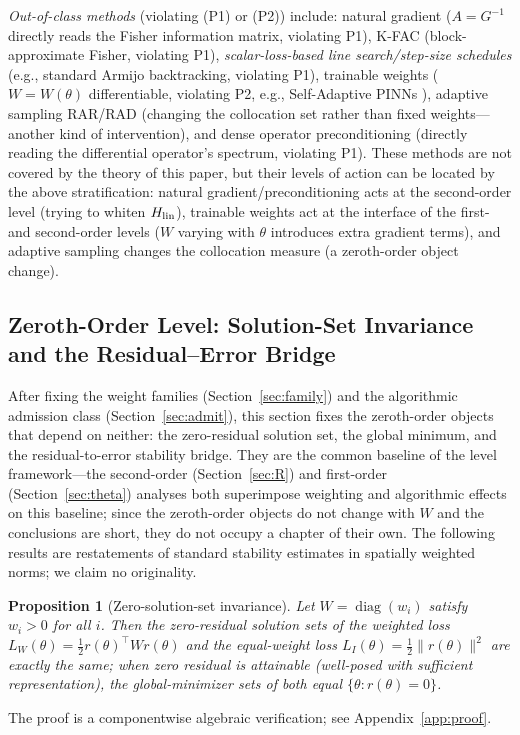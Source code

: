 \documentclass[11pt]{article}
\newcommand{\W}{W}
\DeclareMathOperator{\diag}{diag}
\newtheorem{proposition}{Proposition}[section]
\numberwithin{equation}{section}
\begin{document}
\emph{Out-of-class methods} (violating (P1) or (P2)) include: natural gradient ($A=G^{-1}$ directly reads the Fisher information matrix, violating P1), K-FAC (block-approximate Fisher, violating P1), \emph{scalar-loss-based line search/step-size schedules} (e.g., standard Armijo backtracking, violating P1), trainable weights ($\W=\W(\theta)$ differentiable, violating P2, e.g., Self-Adaptive PINNs \cite{McClenny2020}), adaptive sampling RAR/RAD (changing the collocation set rather than fixed weights---another kind of intervention), and dense operator preconditioning (directly reading the differential operator's spectrum, violating P1). These methods are not covered by the theory of this paper, but their levels of action can be located by the above stratification: natural gradient/preconditioning acts at the second-order level (trying to whiten $H_{\rm lin}$), trainable weights act at the interface of the first- and second-order levels ($\W$ varying with $\theta$ introduces extra gradient terms), and adaptive sampling changes the collocation measure (a zeroth-order object change).

\subsection{Zeroth-Order Level: Solution-Set Invariance and the Residual--Error Bridge}\label{sec:Schan}
After fixing the weight families (Section~\ref{sec:family}) and the algorithmic admission class (Section~\ref{sec:admit}), this section fixes the zeroth-order objects that depend on neither: the zero-residual solution set, the global minimum, and the residual-to-error stability bridge. They are the common baseline of the level framework---the second-order (Section~\ref{sec:R}) and first-order (Section~\ref{sec:theta}) analyses both superimpose weighting and algorithmic effects on this baseline; since the zeroth-order objects do not change with $\W$ and the conclusions are short, they do not occupy a chapter of their own. The following results are restatements of standard stability estimates in spatially weighted norms; we claim no originality.

\begin{proposition}[Zero-solution-set invariance]\label{prop:zero}
Let $\W=\diag(w_i)$ satisfy $w_i>0$ for all $i$. Then the zero-residual solution sets of the weighted loss $L_\W(\theta)=\tfrac12 r(\theta)^\top\W r(\theta)$ and the equal-weight loss $L_I(\theta)=\tfrac12\|r(\theta)\|^2$ are exactly the same; when zero residual is attainable (well-posed with sufficient representation), the global-minimizer sets of both equal $\{\theta:r(\theta)=0\}$.
\end{proposition}
The proof is a componentwise algebraic verification; see Appendix~\ref{app:proof}.
\end{document}
